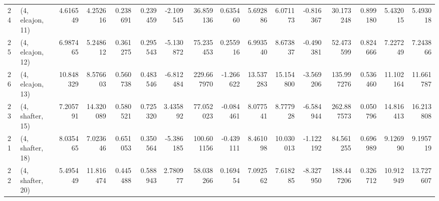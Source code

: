 \begin{tabular}{llrrrrrrrrrrrrrr}
24 &  (4, elcajon, 11) &   4.616549 &   4.252616 &   0.238691 &  0.239459 & -2.109545 &   36.859136 &  0.635460 &   5.692886 &   6.071173 &  -0.816367 &   30.173248 &  0.899180 &   5.432015 &   5.493018 \\
25 &  (4, elcajon, 12) &   6.987465 &   5.248612 &   0.361275 &  0.295543 & -5.130872 &   75.235453 &  0.255916 &   6.993540 &   8.673837 &  -0.490381 &   52.473599 &  0.824666 &   7.227249 &   7.243866 \\
26 &  (4, elcajon, 13) &  10.848329 &   8.576603 &   0.560738 &  0.483546 & -6.812484 &  229.667970 & -1.266622 &  13.537283 &  15.154800 &  -3.569206 &  135.997276 &  0.536460 &  11.102164 &  11.661787 \\
23 &  (4, shafter, 15) &   7.205791 &  14.320089 &   0.580521 &  0.725320 &  3.435892 &   77.052023 & -0.084461 &   8.077541 &   8.777928 &  -6.584944 &  262.887573 &  0.050796 &  14.816413 &  16.213808 \\
21 &  (4, shafter, 18) &   8.035465 &   7.023646 &   0.651053 &  0.350564 & -5.386185 &  100.601156 & -0.439111 &   8.461098 &  10.030013 &  -1.122192 &   84.561255 &  0.696989 &   9.126990 &   9.195719 \\
22 &  (4, shafter, 20) &   5.495449 &  11.816474 &   0.445488 &  0.588943 &  2.780977 &   58.038266 &  0.169454 &   7.092562 &   7.618285 &  -8.327950 &  188.447206 &  0.326712 &  10.912949 &  13.727607 \\
\bottomrule
\end{tabular}
